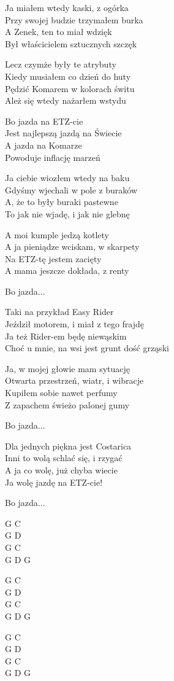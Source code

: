 \begin{text}
    Ja miałem wtedy kaski, z ogórka\\
    Przy swojej budzie trzymałem burka\\
    A Zenek, ten to miał wdzięk\\
    Był właścicielem sztucznych szczęk

    Lecz czymże były te atrybuty\\
    Kiedy musiałem co dzień do huty\\
    Pędzić Komarem w kolorach świtu\\
    Ależ się wtedy nażarłem wstydu

    \vin Bo jazda na ETZ-cie\\
    \vin Jest najlepszą jazdą na Świecie\\
    \vin A jazda na Komarze\\
    \vin Powoduje inflację marzeń

    Ja ciebie wiozłem wtedy na baku\\
    Gdyśmy wjechali w pole z buraków\\
    A, że to były buraki pastewne\\
    To jak nie wjadę, i jak nie glebnę

    A moi kumple jedzą kotlety\\
    A ja pieniądze wciskam, w skarpety\\
    Na ETZ-tę jestem zacięty\\
    A mama jeszcze dokłada, z renty

    \vin Bo jazda...

    Taki na przykład Easy Rider\\
    Jeździł motorem, i miał z tego frajdę\\
    Ja też Rider-em będę niewąskim\\
    Choć u mnie, na wsi jest grunt dość grząski

    Ja, w mojej głowie mam sytuację\\
    Otwarta przestrzeń, wiatr, i wibracje\\
    Kupiłem sobie nawet perfumy\\
    Z zapachem świeżo palonej gumy

    \vin Bo jazda...

    Dla jednych piękna jest Costarica\\
    Inni to wolą schlać się, i rzygać\\
    A ja co wolę, już chyba wiecie\\
    Ja wolę jazdę na ETZ-cie!
	
	\vin Bo jazda...

\end{text}
\begin{chord}
    G C\\
    G D\\
    G C\\
    G D G

    G C\\
    G D\\
    G C\\
    G D G

    G C\\
    G D\\
    G C\\
    G D G
\end{chord}